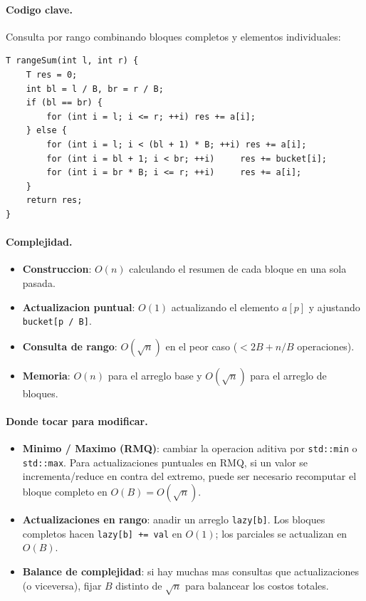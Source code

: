 \paragraph{Codigo clave.}
Consulta por rango combinando bloques completos y elementos individuales:
\begin{verbatim}
T rangeSum(int l, int r) {
    T res = 0;
    int bl = l / B, br = r / B;
    if (bl == br) {
        for (int i = l; i <= r; ++i) res += a[i];
    } else {
        for (int i = l; i < (bl + 1) * B; ++i) res += a[i];
        for (int i = bl + 1; i < br; ++i)     res += bucket[i];
        for (int i = br * B; i <= r; ++i)     res += a[i];
    }
    return res;
}
\end{verbatim}

\paragraph{Complejidad.}
\begin{itemize}\setlength\itemsep{0pt}
	\item \textbf{Construccion}: $O(n)$ calculando el resumen de cada bloque en una sola pasada.
	\item \textbf{Actualizacion puntual}: $O(1)$ actualizando el elemento $a[p]$ y ajustando \verb|bucket[p / B]|.
	\item \textbf{Consulta de rango}: $O(\sqrt{n})$ en el peor caso ($< 2B + n/B$ operaciones).
	\item \textbf{Memoria}: $O(n)$ para el arreglo base y $O(\sqrt{n})$ para el arreglo de bloques.
\end{itemize}

\paragraph{Donde tocar para modificar.}
\begin{itemize}\setlength\itemsep{0pt}
	\item \textbf{Minimo / Maximo (RMQ)}: cambiar la operacion aditiva por \verb|std::min| o \verb|std::max|. Para actualizaciones puntuales en RMQ, si un valor se incrementa/reduce en contra del extremo, puede ser necesario recomputar el bloque completo en $O(B) = O(\sqrt{n})$.
	\item \textbf{Actualizaciones en rango}: anadir un arreglo \verb|lazy[b]|. Los bloques completos hacen \verb|lazy[b] += val| en $O(1)$; los parciales se actualizan en $O(B)$.
	\item \textbf{Balance de complejidad}: si hay muchas mas consultas que actualizaciones (o viceversa), fijar $B$ distinto de $\sqrt{n}$ para balancear los costos totales.
\end{itemize}

